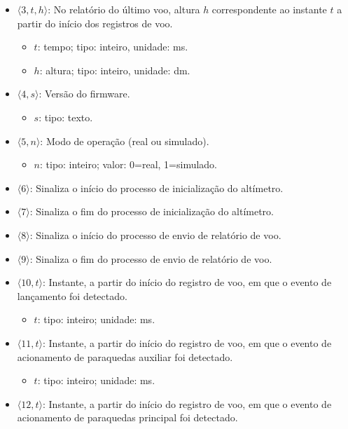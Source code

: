 \documentclass[portuguese,10pt,a4paper]{article}
\begin{document}
\begin{itemize}
\begin{itemize}
	\end{itemize}
	\item $\langle 3, t, h\rangle$: No relatório do último voo, altura $h$ correspondente ao instante $t$ a partir do início dos registros de voo.
	\begin{itemize}
		\item $t$: tempo; tipo: inteiro, unidade: ms.
		\item $h$: altura; tipo: inteiro, unidade: dm.
	\end{itemize}
	\item $\langle 4, s\rangle$: Versão do firmware.
	\begin{itemize}
		\item $s$: tipo: texto.
	\end{itemize}
	\item $\langle 5, n\rangle$: Modo de operação (real ou simulado).
	\begin{itemize}
		\item $n$: tipo: inteiro; valor: 0=real, 1=simulado.
	\end{itemize}
	\item $\langle 6\rangle$: Sinaliza o início do processo de inicialização do altímetro.
	\item $\langle 7\rangle$: Sinaliza o fim do processo de inicialização do altímetro.
	\item $\langle 8\rangle$: Sinaliza o início do processo de envio de relatório de voo.
	\item $\langle 9\rangle$: Sinaliza o fim do processo de envio de relatório de voo.
	\item $\langle 10, t\rangle$: Instante, a partir do início do registro de voo, em que o evento de lançamento foi detectado.
	\begin{itemize}
		\item $t$: tipo: inteiro; unidade: ms.
	\end{itemize}
	\item $\langle 11, t\rangle$: Instante, a partir do início do registro de voo, em que o evento de acionamento de paraquedas auxiliar foi detectado.
	\begin{itemize}
		\item $t$: tipo: inteiro; unidade: ms.
	\end{itemize}
	\item $\langle 12, t\rangle$: Instante, a partir do início do registro de voo, em que o evento de acionamento de paraquedas principal foi detectado.
	\begin{itemize}

\end{itemize}
\end{itemize}
\end{document}
